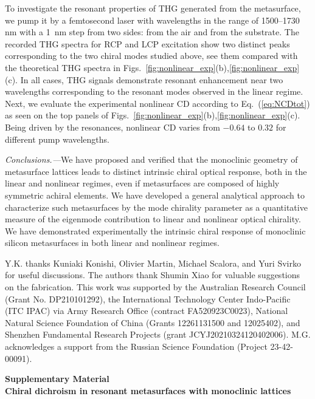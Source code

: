 \documentclass[
    reprint,
    superscriptaddress,
    a4paper,
    amsmath,amssymb,
    prb,
]{revtex4-2}
\begin{document}
To investigate the resonant properties of THG generated from the metasurface, we pump it by a femtosecond laser with wavelengths in the range of 1500--1730 nm with a 1~nm step from two sides: from the air and from the substrate. The recorded THG spectra for RCP and LCP excitation show two distinct peaks corresponding to the two chiral modes studied above, see them compared with the theoretical THG spectra in Figs.~\ref{fig:nonlinear_exp}(b),\ref{fig:nonlinear_exp}(c). In all cases, THG signals demonstrate resonant enhancement near two wavelengths corresponding to the resonant modes observed in the linear regime. Next, we evaluate the experimental nonlinear CD according to Eq.~(\ref{eq:NCDtot}) as seen on the top panels of Figs.~\ref{fig:nonlinear_exp}(b),\ref{fig:nonlinear_exp}(c). Being driven by the resonances, nonlinear CD varies from $-0.64$ to $0.32$ for different pump wavelengths. 


\textit{Conclusions.---}We have proposed and verified that the monoclinic geometry of metasurface lattices leads to distinct intrinsic chiral optical response, both in the linear and nonlinear regimes, even if metasurfaces are composed of highly symmetric achiral elements. We have developed a general analytical approach to characterize such metasurfaces by the mode chirality parameter as a quantitative measure of the eigenmode contribution to linear and nonlinear optical chirality. We have demonstrated experimentally the intrinsic chiral response of monoclinic silicon metasurfaces in both linear and nonlinear regimes.



\begin{acknowledgements}
Y.K. thanks Kuniaki Konishi, Olivier Martin, Michael Scalora, and Yuri Svirko for useful discussions.  The authors thank Shumin Xiao for valuable suggestions on the fabrication. This work was supported by the Australian Research Council (Grant No. DP210101292), the International Technology Center Indo-Pacific (ITC IPAC) via Army Research Office (contract FA520923C0023), National Natural Science Foundation of China (Grants 12261131500 and 12025402), and Shenzhen Fundamental Research Projects (grant JCYJ20210324120402006). M.G. acknowledges a support from the Russian Science Foundation (Project 23-42-00091).
\end{acknowledgements}




\appendix
\newpage 
\onecolumngrid


\begin{center}
	\textbf{Supplementary Material} \\
	\textbf{Chiral dichroism in resonant metasurfaces with monoclinic lattices}
\end{center}
\end{document}
